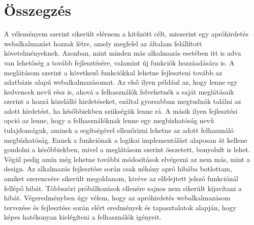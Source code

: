 \documentclass[]{thesis-ekf}
\theoremstyle{definition}
\theoremstyle{remark}
\begin{document}
	\chapter*{Összegzés}
		A véleményem szerint sikerült elérnem a kitűzött célt, miszerint egy apróhirdetés webalkalmazást hozzak létre, amely megfelel az általam felállított követelményeknek. Azonban, mint minden más alkalmazás esetében itt is adva van lehetőség a tovább fejlesztésére, valamint új funkciók hozzáadására is. A meglátásom szerint a következő funkciókkal lehetne fejleszteni tovább az adatbázis alapú webalkalmazásomat. Az első ilyen például az, hogy lenne egy kedvencek nevű rész is, ahová a felhasználók felvehetnék a saját meglátásaik szerint a hozzá közelálló hirdetéseket, ezáltal gyorsabban megtudnák találni az adott hirdetést, ha későbbiekben szükségük lenne rá. A másik ilyen fejlesztési opció az lenne, hogy a felhasználóknak lenne egy megbízhatóság nevű tulajdonságuk, aminek a segítségével ellenőrizni lehetne az adott felhasználó megbízhatóság. Ennek a funkciónak a logikai implementálást alaposan át kellene gondolni a későbbiekben, mivel a meglátásom szerint összetett, bonyolult is lehet. Végül pedig amin még lehetne további módosítások elvégezni az nem más, mint a design. Az alkalmazás fejlesztése során csak néhány apró hibába botlottam, amiket szerencsére sikerült megoldanom, kivéve az elfelejtett jelszó funkciónál fellépő hibát. Többszöri próbálkozások ellenére sajnos nem sikerült kijavítani a hibát. Végeredményben úgy vélem, hogy az apróhirdetés webalkalmazásom tervezése és fejlesztése során elért eredmények és tapasztalatok alapján, hogy képes hatékonyan kielégíteni a felhasználók igényeit.
	
\end{document}
